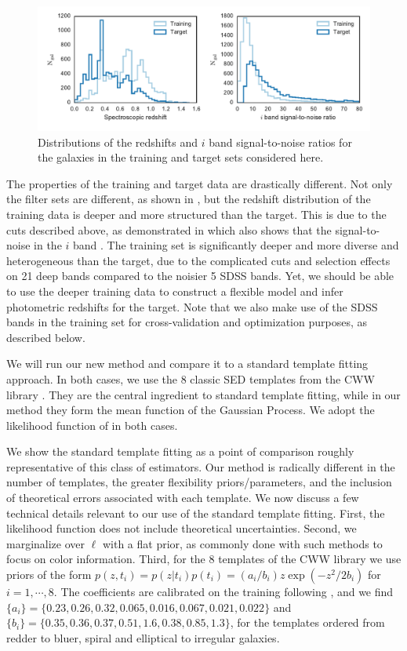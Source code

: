 \documentclass[aps,prd,showpacs,superscriptaddress,groupedaddress]{revtex4}  %
\begin{document}
\begin{figure}
\centering
\includegraphics[width=16cm]{training_vs_target.pdf}
\caption{Distributions of the redshifts and $i$ band signal-to-noise ratios for the galaxies in the training and target sets considered here.}
\label{fig:training_vs_target}
\end{figure}

The properties of the training and target data are drastically different.
Not only the filter sets are different, as shown in , but the redshift distribution of the training data is deeper and more structured than the target.
This is due to the cuts described above, as demonstrated in  which also shows that the signal-to-noise in the $i$ band .
The training set is significantly deeper and more diverse and heterogeneous than the target, due to the complicated cuts and selection effects on 21 deep bands compared to the noisier 5 SDSS bands.
Yet, we should be able to use the deeper training data to construct a flexible model and infer photometric redshifts for the target.
Note that we also make use of the SDSS bands in the training set for cross-validation and optimization purposes, as described below.

We will run our new method and compare it to a standard template fitting approach.
In both cases, we use the 8 classic SED templates from the CWW library \citep{Coleman:1980ej, Benitez:1998br}. 
They are the central ingredient to standard template fitting, while in our method they form the mean function of the Gaussian Process. 
We adopt the likelihood function of  in both cases.

We show the standard template fitting as a point of comparison roughly representative of this class of \photoz estimators.
Our method is radically different in the number of templates, the greater flexibility priors/parameters, and the inclusion of theoretical errors associated with each template.
We now discuss a few technical details relevant to our use of the standard template fitting.
First, the likelihood function does not include theoretical uncertainties. 
Second, we marginalize over $\ell$ with a flat prior, as commonly done with such \photoz methods to focus on color information.
Third, for the 8 templates of the CWW library we use priors of the form $p(z,t_i)= p(z|t_i)p(t_i) = ({a_i}/{b_i} ) z \exp(-{z^2}/{2 b_i} ) $ for $i=1, \cdots, 8$. 
The coefficients are calibrated on the training following \citep{Coleman:1980ej, Benitez:1998br}, and we find
$\{a_i\} = \{ 0.23, 0.26, 0.32, 0.065, 0.016, 0.067, 0.021, 0.022 \}$ and $\{b_i\} = \{ 0.35, 0.36, 0.37, 0.51, 1.6, 0.38, 0.85, 1.3\}$, for the templates ordered from redder to bluer, \ie spiral and elliptical to irregular galaxies.
\end{document}
